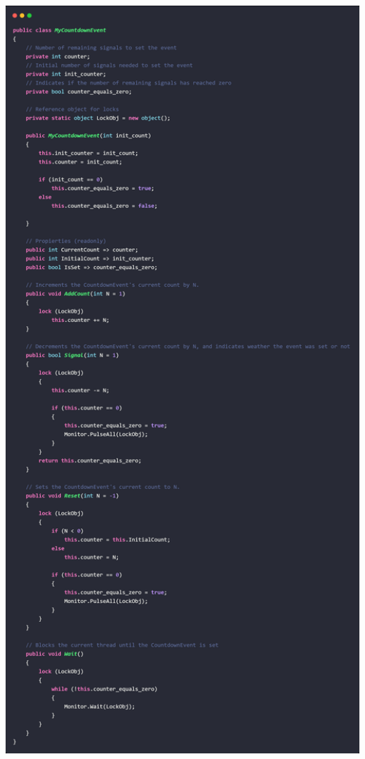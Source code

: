\documentclass[10pt]{article} %
\begin{document}
\begin{center}
	\includegraphics[width=15cm]{MyCountdownEvent.jpg}
\end{center}
\end{document}
